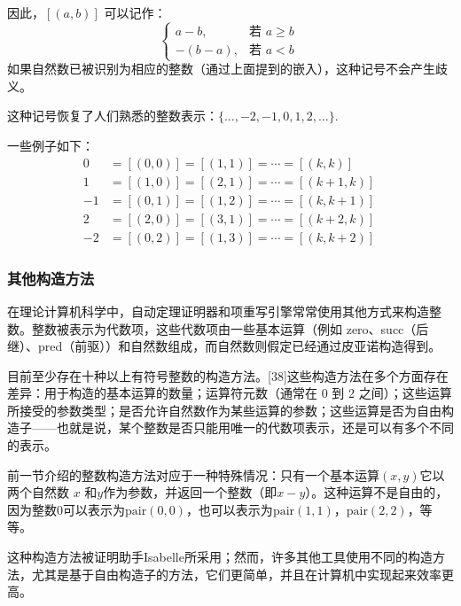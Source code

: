 因此，$[(a,b)]$ 可以记作：
$$
\begin{cases}
a-b, & \text{若 } a \geq b \\[6pt]
-(b-a), & \text{若 } a < b
\end{cases}~
$$
如果自然数已被识别为相应的整数（通过上面提到的嵌入），这种记号不会产生歧义。

这种记号恢复了人们熟悉的整数表示：$\{ \ldots, -2, -1, 0, 1, 2, \ldots \}$.

一些例子如下：
$$
\begin{aligned}
0 &= [(0,0)] = [(1,1)] = \cdots = [(k,k)] \\[6pt]
1 &= [(1,0)] = [(2,1)] = \cdots = [(k+1,k)] \\[6pt]
-1 &= [(0,1)] = [(1,2)] = \cdots = [(k,k+1)] \\[6pt]
2 &= [(2,0)] = [(3,1)] = \cdots = [(k+2,k)] \\[6pt]
-2 &= [(0,2)] = [(1,3)] = \cdots = [(k,k+2)]
\end{aligned}~
$$
\subsubsection{其他构造方法}
在理论计算机科学中，自动定理证明器和项重写引擎常常使用其他方式来构造整数。整数被表示为代数项，这些代数项由一些基本运算（例如 zero、succ（后继）、pred（前驱））和自然数组成，而自然数则假定已经通过皮亚诺构造得到。

目前至少存在十种以上有符号整数的构造方法。[38]这些构造方法在多个方面存在差异：用于构造的基本运算的数量；运算符元数（通常在 0 到 2 之间）；这些运算所接受的参数类型；是否允许自然数作为某些运算的参数；这些运算是否为自由构造子——也就是说，某个整数是否只能用唯一的代数项表示，还是可以有多个不同的表示。

前一节介绍的整数构造方法对应于一种特殊情况：只有一个基本运算$(x,y)$它以两个自然数 $x$ 和$y$作为参数，并返回一个整数（即$x-y$）。这种运算不是自由的，因为整数$0$可以表示为$\text{pair}(0,0)$，也可以表示为$\text{pair}(1,1)$，$\text{pair}(2,2)$，等等。

这种构造方法被证明助手Isabelle所采用；然而，许多其他工具使用不同的构造方法，尤其是基于自由构造子的方法，它们更简单，并且在计算机中实现起来效率更高。
